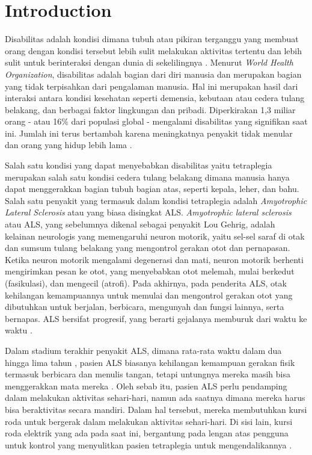 \section{Introduction}
\label{sec:introduction}

Disabilitas adalah kondisi dimana tubuh atau pikiran terganggu yang membuat orang dengan kondisi tersebut lebih sulit melakukan aktivitas tertentu dan lebih sulit untuk berinteraksi dengan dunia di sekelilingnya \cite{CDC_2020}. Menurut \textit{World Health Organization}, disabilitas adalah bagian dari diri manusia dan merupakan bagian yang tidak terpisahkan dari pengalaman manusia. Hal ini merupakan hasil dari interaksi antara kondisi kesehatan seperti demensia, kebutaan atau cedera tulang belakang, dan berbagai faktor lingkungan dan pribadi. Diperkirakan 1,3 miliar orang - atau 16\% dari populasi global - mengalami disabilitas yang signifikan saat ini. Jumlah ini terus bertambah karena meningkatnya penyakit tidak menular dan orang yang hidup lebih lama \cite{WHO_2023}.

Salah satu kondisi yang dapat menyebabkan disabilitas yaitu tetraplegia merupakan salah satu kondisi cedera tulang belakang dimana manusia hanya dapat menggerakkan bagian tubuh bagian atas, seperti kepala, leher, dan bahu. Salah satu penyakit yang termasuk dalam kondisi tetraplegia adalah \textit{Amyotrophic Lateral Sclerosis} atau yang biasa disingkat ALS. \textit{Amyotrophic lateral sclerosis} atau ALS, yang sebelumnya dikenal sebagai penyakit Lou Gehrig, adalah kelainan neurologis yang memengaruhi neuron motorik, yaitu sel-sel saraf di otak dan sumsum tulang belakang yang mengontrol gerakan otot dan pernapasan. Ketika neuron motorik mengalami degenerasi dan mati, neuron motorik berhenti mengirimkan pesan ke otot, yang menyebabkan otot melemah, mulai berkedut (fasikulasi), dan mengecil (atrofi). Pada akhirnya, pada penderita ALS, otak kehilangan kemampuannya untuk memulai dan mengontrol gerakan otot yang dibutuhkan untuk berjalan, berbicara, mengunyah dan fungsi lainnya, serta bernapas. ALS bersifat progresif, yang berarti gejalanya memburuk dari waktu ke waktu \cite{NINDS}. 

Dalam stadium terakhir penyakit ALS, dimana rata-rata waktu dalam dua hingga lima tahun \cite{ALS_2023}, pasien ALS biasanya kehilangan kemampuan gerakan fisik termasuk berbicara dan menulis tangan, tetapi untungnya mereka masih bisa menggerakkan mata mereka \cite{Eyesay_2023}. Oleh sebab itu, pasien ALS perlu pendamping dalam melakukan aktivitas sehari-hari, namun ada saatnya dimana mereka harus bisa beraktivitas secara mandiri. Dalam hal tersebut, mereka membutuhkan kursi roda untuk bergerak dalam melakukan aktivitas sehari-hari. Di sisi lain, kursi roda elektrik yang ada pada saat ini, bergantung pada lengan atas pengguna untuk kontrol yang menyulitkan pasien tetraplegia untuk mengendalikannya \cite{9935646}. 

